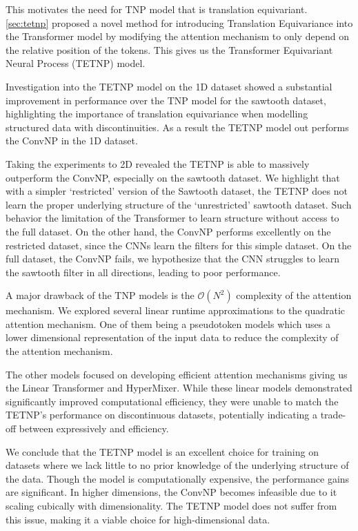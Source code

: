 \documentclass[../../main.tex]{subfiles}
\begin{document}
This motivates the need for TNP model that is translation equivariant. \autoref{sec:tetnp} proposed a novel method for introducing Translation Equivariance into the Transformer model by modifying the attention mechanism to only depend on the relative position of the tokens. This gives us the Transformer Equivariant Neural Process (TETNP) model.

Investigation into the TETNP model on the 1D dataset showed a substantial improvement in performance over the TNP model for the sawtooth dataset, highlighting the importance of translation equivariance when modelling structured data with discontinuities. As a result the TETNP model out performs the ConvNP in the 1D dataset.

Taking the experiments to 2D revealed the TETNP is able to massively outperform the ConvNP, especially on the sawtooth dataset. We highlight that with a simpler `restricted' version of the Sawtooth dataset, the TETNP does not learn the proper underlying structure of the `unrestricted' sawtooth dataset. Such behavior the limitation of the Transformer to learn structure without access to the full dataset. On the other hand, the ConvNP performs excellently on the restricted dataset, since the CNNs learn the filters for this simple dataset. On the full dataset, the ConvNP fails, we hypothesize that the CNN struggles to learn the sawtooth filter in all directions, leading to poor performance.

A major drawback of the TNP models is the $\mathcal{O}(N^2)$ complexity of the attention mechanism. We explored several linear runtime approximations to the quadratic attention mechanism. One of them being a  pseudotoken models which uses a lower dimensional representation of the input data to reduce the complexity of the attention mechanism. 

The other models focused on developing efficient attention mechanisms giving us the Linear Transformer and HyperMixer. While these linear models demonstrated significantly improved computational efficiency, they were unable to match the TETNP's performance on discontinuous datasets, potentially indicating a trade-off between expressively and efficiency. 

We conclude that the TETNP model is an excellent choice for training on datasets where we lack little to no prior knowledge of the underlying structure of the data. Though the model is computationally expensive, the performance gains are significant. In higher dimensions, the ConvNP becomes infeasible due to it scaling cubically with dimensionality. The TETNP model does not suffer from this issue, making it a viable choice for high-dimensional data.

\ifSubfilesClassLoaded{%
    \printbibliography{}
}{} 
\end{document}
